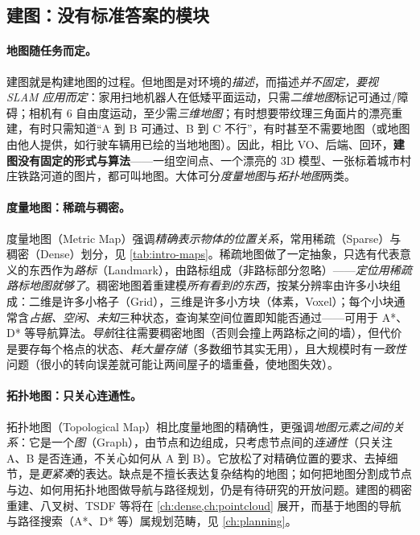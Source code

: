 \subsection{建图：没有标准答案的模块}
\label{sec:intro-mapping}
\paragraph{地图随任务而定。}
建图就是构建地图的过程。但地图是对环境的\emph{描述}，而描述\emph{并不固定，要视 SLAM 应用而定}\cite{gaoxiang2019slam14}：家用扫地机器人在低矮平面运动，只需\emph{二维地图}标记可通过/障碍；相机有 $6$ 自由度运动，至少需\emph{三维地图}；有时想要带纹理三角面片的漂亮重建，有时只需知道“A 到 B 可通过、B 到 C 不行”，有时甚至不需要地图（或地图由他人提供，如行驶车辆用已绘的当地地图）。因此，相比 VO、后端、回环，\textbf{建图没有固定的形式与算法}——一组空间点、一个漂亮的 3D 模型、一张标着城市村庄铁路河道的图片，都可叫地图。大体可分\emph{度量地图}与\emph{拓扑地图}两类。

\paragraph{度量地图：稀疏与稠密。}
度量地图（Metric Map）强调\emph{精确表示物体的位置关系}，常用稀疏（Sparse）与稠密（Dense）划分，见 \cref{tab:intro-maps}。稀疏地图做了一定抽象，只选有代表意义的东西作为\emph{路标}（Landmark），由路标组成（非路标部分忽略）——\emph{定位用稀疏路标地图就够了}。稠密地图着重建模\emph{所有看到的东西}，按某分辨率由许多小块组成：二维是许多小格子（Grid），三维是许多小方块（体素，Voxel）；每个小块通常含\emph{占据、空闲、未知}三种状态，查询某空间位置即知能否通过——可用于 A*、D* 等导航算法。\emph{导航}往往需要稠密地图（否则会撞上两路标之间的墙），但代价是要存每个格点的状态、\emph{耗大量存储}（多数细节其实无用），且大规模时有\emph{一致性}问题（很小的转向误差就可能让两间屋子的墙重叠，使地图失效）。

\paragraph{拓扑地图：只关心连通性。}
拓扑地图（Topological Map）相比度量地图的精确性，更强调\emph{地图元素之间的关系}：它是一个\emph{图}（Graph），由节点和边组成，只考虑节点间的\emph{连通性}（只关注 A、B 是否连通，不关心如何从 A 到 B）。它放松了对精确位置的要求、去掉细节，是\emph{更紧凑}的表达。缺点是不擅长表达复杂结构的地图；如何把地图分割成节点与边、如何用拓扑地图做导航与路径规划，仍是有待研究的开放问题。建图的稠密重建、八叉树、TSDF 等将在 \cref{ch:dense,ch:pointcloud} 展开，而基于地图的导航与路径搜索（A*、D* 等）属规划范畴，见 \cref{ch:planning}。

